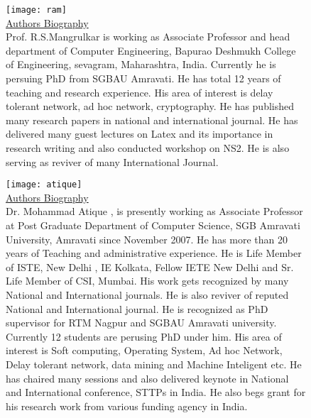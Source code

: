 \documentclass[3p,times]{elsarticle}
\begin{document}


\begin{figure}[h!]
\mbox{\texttt{[image: ram]}}
\\ \underline{Authors Biography} \\   Prof. R.S.Mangrulkar is working as Associate Professor and head department of Computer Engineering, Bapurao Deshmukh College of Engineering, sevagram, Maharashtra, India. Currently he is persuing PhD  from SGBAU Amravati. He has total 12 years of teaching and research experience.  His area of interest is delay tolerant network, ad hoc network, cryptography.  He has published many research papers in national and international journal. He has delivered many guest lectures on Latex and its importance in research  writing and also conducted workshop on NS2. He is also serving as reviver of many International Journal.
\end{figure}
\begin{figure}[h!]
\mbox{\texttt{[image: atique]}}
\\ \underline{Authors Biography} \\   Dr. Mohammad Atique , is presently working as Associate Professor at Post Graduate Department of Computer Science, SGB Amravati University, Amravati since November 2007. He has more than 20 years of Teaching and administrative experience. He is Life Member of ISTE, New Delhi , IE Kolkata, Fellow IETE New Delhi and Sr. Life Member of CSI, Mumbai. His work gets recognized by many National and International journals. He is also reviver of reputed National and International journal. He is recognized as PhD supervisor for RTM Nagpur and SGBAU Amravati university. Currently 12 students are perusing PhD under him. His area of interest is Soft computing, Operating System, Ad hoc Network, Delay tolerant network, data mining and Machine Inteligent etc. He has chaired many sessions and also delivered keynote in National and International conference, STTPs in India. He also begs grant for his research work from various funding agency in India.                        

\end{figure}
\end{document}
